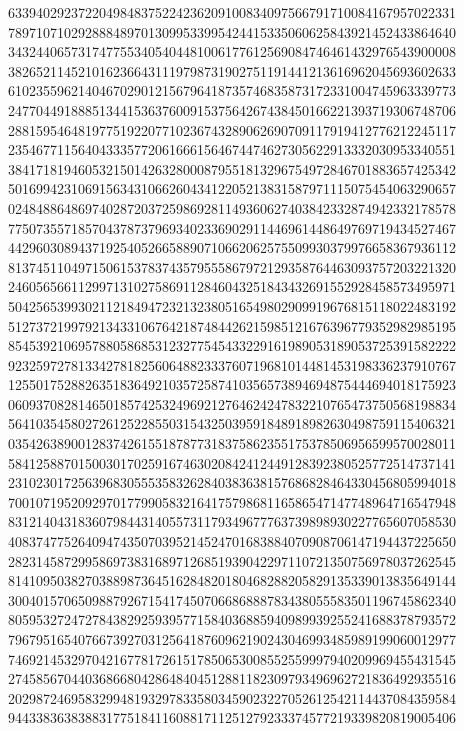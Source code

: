 {{    6339402923722049848375224236209100834097566791710084167957022331 ~
    7897107102928884897013099533995424415335060625843921452433864640 ~
    3432440657317477553405404481006177612569084746461432976543900008 ~
    3826521145210162366431119798731902751191441213616962045693602633 ~
    6102355962140467029012156796418735746835873172331004745963339773 ~
    2477044918885134415363760091537564267438450166221393719306748706 ~
    2881595464819775192207710236743289062690709117919412776212245117 ~
    2354677115640433357720616661564674474627305622913332030953340551 ~
    3841718194605321501426328000879551813296754972846701883657425342 ~
    5016994231069156343106626043412205213831587971115075454063290657 ~
    0248488648697402872037259869281149360627403842332874942332178578 ~
    7750735571857043787379693402336902911446961448649769719434527467 ~
    4429603089437192540526658890710662062575509930379976658367936112 ~
    8137451104971506153783743579555867972129358764463093757203221320 ~
    2460565661129971310275869112846043251843432691552928458573495971 ~
    5042565399302112184947232132380516549802909919676815118022483192 ~
    5127372199792134331067642187484426215985121676396779352982985195 ~
    8545392106957880586853123277545433229161989053189053725391582222 ~
    9232597278133427818256064882333760719681014481453198336237910767 ~
    1255017528826351836492103572587410356573894694875444694018175923 ~
    0609370828146501857425324969212764624247832210765473750568198834 ~
    5641035458027261252285503154325039591848918982630498759115406321 ~
    0354263890012837426155187877318375862355175378506956599570028011 ~
    5841258870150030170259167463020842412449128392380525772514737141 ~
    2310230172563968305553583262840383638157686828464330456805994018 ~
    7001071952092970177990583216417579868116586547147748964716547948 ~
    8312140431836079844314055731179349677763739898930227765607058530 ~
    4083747752640947435070395214524701683884070908706147194437225650 ~
    2823145872995869738316897126851939042297110721350756978037262545 ~
    8141095038270388987364516284820180468288205829135339013835649144 ~
    3004015706509887926715417450706686888783438055583501196745862340 ~
    8059532724727843829259395771584036885940989939255241688378793572 ~
    7967951654076673927031256418760962190243046993485989199060012977 ~
    7469214532970421677817261517850653008552559997940209969455431545 ~
    2745856704403686680428648404512881182309793496962721836492935516 ~
    2029872469583299481932978335803459023227052612542114437084359584 ~
    9443383638388317751841160881711251279233374577219339820819005406 ~
}}

